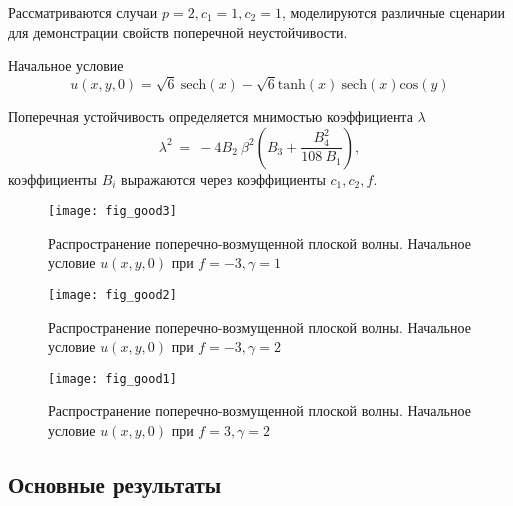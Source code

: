 \begin{frame}
	Рассматриваются случаи $p=2, c_1 = 1, c_2 = 1$, моделируются различные сценарии для демонстрации свойств поперечной неустойчивости.
	
	Начальное условие
	$$
	u(x,y,0) = \sqrt{6} ~{\text{sech}}(x)-\sqrt{6}{\text{tanh}} (x) ~{\text{sech}}(x) {\text{cos}} (y)
	$$
	
	Поперечная устойчивость определяется мнимостью коэффициента $\lambda$ 
	$$
	\lambda^2~=~-4 B_2~\beta^2\left(B_3 +\frac{B_4^2}{108~B_1}\right),
	$$
	коэффициенты $B_i$ выражаются через коэффициенты $c_1, c_2, f$\footnotemark.

\end{frame}

\begin{frame}
	\begin{figure}
		\begin{center}
			\texttt{[image: fig\_good3]}
		\end{center}
		Распространение поперечно-возмущенной плоской волны. Начальное условие $u(x,y,0)$ при $f = -3, \gamma = 1$
	\end{figure}
\end{frame}

\begin{frame}
	\begin{figure}
		\begin{center}
			\texttt{[image: fig\_good2]}
		\end{center}
		Распространение поперечно-возмущенной плоской волны. Начальное условие $u(x,y,0)$ при $f = -3, \gamma = 2$
	\end{figure}
\end{frame}

\begin{frame}
	\begin{figure}
		\begin{center}
			\texttt{[image: fig\_good1]}
		\end{center}
		Распространение поперечно-возмущенной плоской волны. Начальное условие $u(x,y,0)$ при $f = 3, \gamma = 2$
	\end{figure}
\end{frame}

\subsection{Основные результаты}

